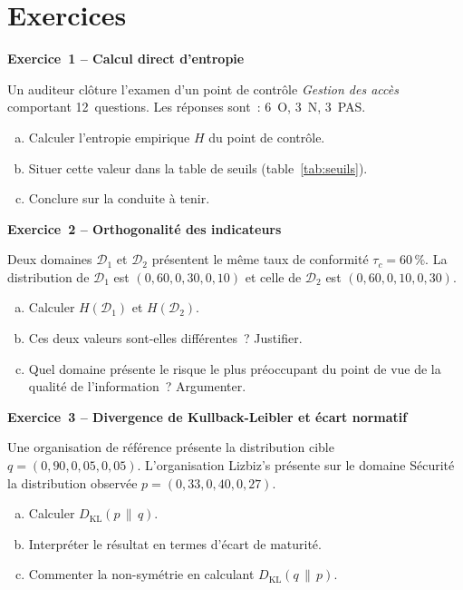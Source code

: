 \section*{Exercices}


\begin{boxexo}
\textbf{Exercice~1 – Calcul direct d'entropie}

Un auditeur clôture l'examen d'un point de contrôle \emph{Gestion des accès}
comportant 12~questions. Les réponses sont~: 6~O, 3~N, 3~PAS.

\begin{enumerate}[(a)]
  \item Calculer l'entropie empirique $H$ du point de contrôle.
  \item Situer cette valeur dans la table de seuils (table~\ref{tab:seuils}).
  \item Conclure sur la conduite à tenir.
\end{enumerate}
\end{boxexo}

\begin{boxexo}
\textbf{Exercice~2 – Orthogonalité des indicateurs}

Deux domaines $\mathcal{D}_1$ et $\mathcal{D}_2$ présentent le même taux de
conformité $\tau_c = 60\,\%$. La distribution de $\mathcal{D}_1$ est
$(0{,}60, 0{,}30, 0{,}10)$ et celle de $\mathcal{D}_2$ est $(0{,}60, 0{,}10, 0{,}30)$.

\begin{enumerate}[(a)]
  \item Calculer $H(\mathcal{D}_1)$ et $H(\mathcal{D}_2)$.
  \item Ces deux valeurs sont-elles différentes~? Justifier.
  \item Quel domaine présente le risque le plus préoccupant du point de vue de
        la qualité de l'information~? Argumenter.
\end{enumerate}
\end{boxexo}

\begin{boxexo}
\textbf{Exercice~3 – Divergence de Kullback-Leibler et écart normatif}

Une organisation de référence présente la distribution cible
$q = (0{,}90, 0{,}05, 0{,}05)$. L'organisation Lizbiz's présente sur le domaine
Sécurité la distribution observée $p = (0{,}33, 0{,}40, 0{,}27)$.

\begin{enumerate}[(a)]
  \item Calculer $D_{\mathrm{KL}}(p \,\|\, q)$.
  \item Interpréter le résultat en termes d'écart de maturité.
  \item Commenter la non-symétrie en calculant $D_{\mathrm{KL}}(q \,\|\, p)$.
\end{enumerate}
\end{boxexo}

